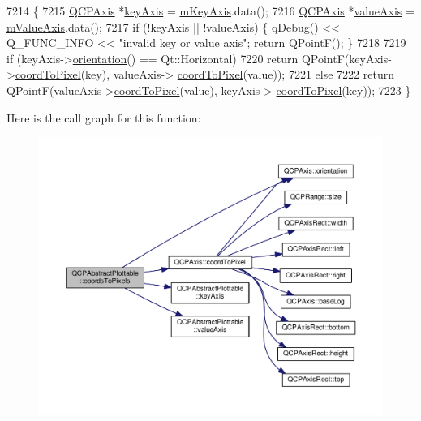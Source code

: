\begin{DoxyCode}
7214 \{
7215   \hyperlink{class_q_c_p_axis}{QCPAxis} *\hyperlink{class_q_c_p_abstract_plottable_a72c7a09c22963f2c943f07112b311103}{keyAxis} = \hyperlink{class_q_c_p_abstract_plottable_a426f42e254d0f8ce5436a868c61a6827}{mKeyAxis}.data();
7216   \hyperlink{class_q_c_p_axis}{QCPAxis} *\hyperlink{class_q_c_p_abstract_plottable_a3106f9d34d330a6097a8ec5905e5b519}{valueAxis} = \hyperlink{class_q_c_p_abstract_plottable_a2901452ca4aea911a1827717934a4bda}{mValueAxis}.data();
7217   \textcolor{keywordflow}{if} (!keyAxis || !valueAxis) \{ qDebug() << Q\_FUNC\_INFO << \textcolor{stringliteral}{"invalid key or value axis"}; \textcolor{keywordflow}{return} QPointF(); \}
7218   
7219   \textcolor{keywordflow}{if} (keyAxis->\hyperlink{class_q_c_p_axis_a57483f2f60145ddc9e63f3af53959265}{orientation}() == Qt::Horizontal)
7220     \textcolor{keywordflow}{return} QPointF(keyAxis->\hyperlink{class_q_c_p_axis_a985ae693b842fb0422b4390fe36d299a}{coordToPixel}(key), valueAxis->
      \hyperlink{class_q_c_p_axis_a985ae693b842fb0422b4390fe36d299a}{coordToPixel}(value));
7221   \textcolor{keywordflow}{else}
7222     \textcolor{keywordflow}{return} QPointF(valueAxis->\hyperlink{class_q_c_p_axis_a985ae693b842fb0422b4390fe36d299a}{coordToPixel}(value), keyAxis->
      \hyperlink{class_q_c_p_axis_a985ae693b842fb0422b4390fe36d299a}{coordToPixel}(key));
7223 \}
\end{DoxyCode}


Here is the call graph for this function\+:\nopagebreak
\begin{figure}[H]
\begin{center}
\leavevmode
\includegraphics[width=350pt]{class_q_c_p_abstract_plottable_a9fd1c9df8391781f05b0be22fbe91e13_cgraph}
\end{center}
\end{figure}



